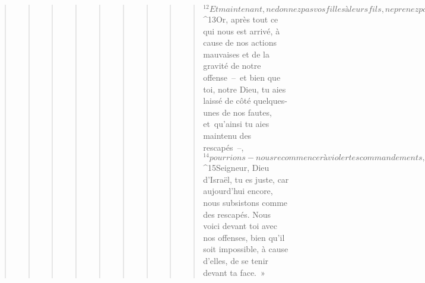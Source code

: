 \begin{verse}
\begin{verse}
\begin{verse}
\begin{verse}
\begin{verse}
\begin{verse}
\begin{verse}
\begin{verse}
\begin{verse}
${}^{12}Et maintenant, ne donnez pas vos filles à leurs fils, ne prenez pas leurs filles pour vos fils, ne vous inquiétez jamais de leur prospérité ni de leur bonheur, afin que vous deveniez forts, que vous mangiez les biens du pays et que vous les laissiez en héritage à vos fils pour toujours.” 
${}^{13}Or, après tout ce qui nous est arrivé, à cause de nos actions mauvaises et de la gravité de notre offense – et bien que toi, notre Dieu, tu aies laissé de côté quelques-unes de nos fautes, et qu’ainsi tu aies maintenu des rescapés –, 
${}^{14}pourrions-nous recommencer à violer tes commandements, et à nous lier par le mariage à ces peuples abominables ? Ne vas-tu pas t’irriter contre nous au point de nous exterminer sans laisser ni reste ni rescapés ? 
${}^{15}Seigneur, Dieu d’Israël, tu es juste, car aujourd’hui encore, nous subsistons comme des rescapés. Nous voici devant toi avec nos offenses, bien qu’il soit impossible, à cause d’elles, de se tenir devant ta face. »
      

\end{verse}
\end{verse}
\end{verse}
\end{verse}
\end{verse}
\end{verse}
\end{verse}
\end{verse}
\end{verse}
